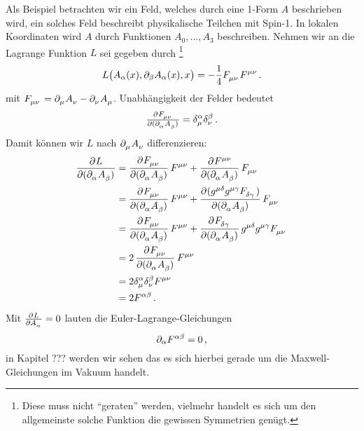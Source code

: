  \begin{beispiel} \label{bsp:Spinone}
Als Beispiel betrachten wir ein Feld, welches durch eine
1-Form $A$ beschrieben wird, ein solches Feld beschreibt physikalische Teilchen
mit Spin-1.
In lokalen Koordinaten wird $A$ durch Funktionen $A_0,\dots,A_3$ beschreiben. Nehmen wir an die Lagrange
Funktion $L$ sei gegeben durch \footnote{Diese muss nicht "`geraten"'
werden, vielmehr handelt es sich um den allgemeinste solche Funktion die
gewissen Symmetrien genügt. }
\begin{equation}
L\left(A_\alpha(x),\partial_\beta
A_\alpha(x),x\right)=-\frac{1}{4}\tensor{F}{_\mu_\nu}\tensor{F}{^\mu^\nu}\,.
\end{equation}
mit
$\tensor{F}{_\mu_\nu}=\tensor{\partial}{_\mu}\tensor{A}{_\nu}-\tensor{\partial}{_\nu}\tensor{A}{_\mu}$.
Unabhängigkeit der Felder bedeutet
\begin{equation}
\pd{\tensor{F}{_\mu_\nu}}{(\tensor{\partial}{_\alpha}\tensor{A}{_\beta})}
=\tensor*{\delta}{^\alpha_\mu}\tensor*{\delta}{^\beta_\nu}\,.
\end{equation}
Damit können wir $L$ nach $\tensor{\partial}{_\mu}\tensor{A}{_\nu}$
differenzieren:
\begin{equation}
\begin{split}
\dpd{L}{(\tensor{\partial}{_\alpha}\tensor{A}{_\beta})}
&=\dpd{\tensor{F}{_\mu_\nu}}{(\tensor{\partial}{_\alpha}\tensor{A}{_\beta})}\tensor{F}{^\mu^\nu}
+\dpd{\tensor{F}{^\mu^\nu}}{(\tensor{\partial}{_\alpha}\tensor{A}{_\beta})}\tensor{F}{_\mu_\nu}
\\
&=\dpd{\tensor{F}{_\mu_\nu}}{(\tensor{\partial}{_\alpha}\tensor{A}{_\beta})}\tensor{F}{^\mu^\nu}
+\dpd{(\tensor{g}{^\mu^\delta}\tensor{g}{^\mu^\gamma}\tensor{F}{_\delta_\gamma})}{(\tensor{\partial}{_\alpha}\tensor{A}{_\beta})}\tensor{F}{_\mu_\nu}
\\
&=\dpd{\tensor{F}{_\mu_\nu}}{(\tensor{\partial}{_\alpha}\tensor{A}{_\beta})}\tensor{F}{^\mu^\nu}
+\dpd{\tensor{F}{_\delta_\gamma}}{(\tensor{\partial}{_\alpha}\tensor{A}{_\beta})}\tensor{g}{^\mu^\delta}\tensor{g}{^\mu^\gamma}\tensor{F}{_\mu_\nu}
\\
&=2\dpd{\tensor{F}{_\mu_\nu}}{(\tensor{\partial}{_\alpha}\tensor{A}{_\beta})}\tensor{F}{^\mu^\nu}\\
&=2\tensor*{\delta}{^\alpha_\mu}\tensor*{\delta}{^\beta_\nu}\tensor{F}{^\mu^\nu}\\
&=2\tensor{F}{^\alpha^\beta}\,.
\end{split}
\end{equation}
Mit $\pd{L}{\tensor{A}{_\alpha}}=0$ lauten die Euler-Lagrange-Gleichungen
\begin{equation}
\partial_\alpha\tensor{F}{^\alpha^\beta}=0\,,
\end{equation}
in Kapitel ??? werden wir sehen das es sich hierbei gerade um die
Maxwell-Gleichungen im Vakuum handelt.
\end{beispiel}
